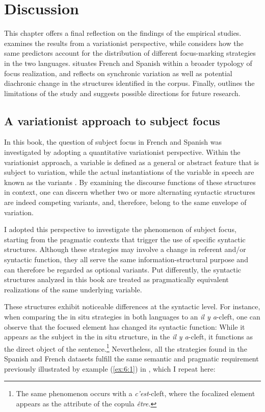 
\chapter{Discussion}\label{sec:6}

This chapter offers a final reflection on the findings of the empirical studies.  examines the results from a variationist perspective, while  considers how the same predictors account for the distribution of different focus-marking strategies in the two languages.  situates French and Spanish within a broader typology of focus realization, and  reflects on synchronic variation as well as potential diachronic change in the structures identified in the corpus. Finally,  outlines the limitations of the study and suggests possible directions for future research.

\section{A variationist approach to subject focus} \label{sub:7.1}

In this book, the question of subject focus in French and Spanish was investigated by adopting a quantitative variationist perspective. Within the variationist approach, a variable is defined as a general or abstract feature that is subject to variation, while the actual instantiations of the variable in speech are known as the variants \parencite{meyerhoff2018introducing}. By examining the discourse functions of these structures in context, one can discern whether two or more alternating syntactic structures are indeed competing variants, and, therefore, belong to the same envelope of variation. 

I adopted this perspective to investigate the phenomenon of subject focus, starting from the pragmatic contexts that trigger the use of specific syntactic structures. Although these strategies may involve a change in referent and/or syntactic function, they all serve the same information-structural purpose and can therefore be regarded as optional variants. Put differently, the syntactic structures analyzed in this book are treated as pragmatically equivalent realizations of the same underlying variable.

These structures exhibit noticeable differences at the syntactic level. For instance, when comparing the in situ strategies in both languages to an \textit{il y a}-cleft, one can observe that the focused element has changed its syntactic function: While it appears as the subject in the in situ structure, in the \textit{il y a}-cleft, it functions as the direct object of the sentence.\footnote{The same phenomenon occurs with a \textit{c'est}-cleft, where the focalized element appears as the attribute of the copula \textit{être.}} Nevertheless, all the strategies found in the Spanish and French datasets fulfill the same semantic and pragmatic requirement previously illustrated by example (\ref{ex:6:1}) in , which I repeat here: 

